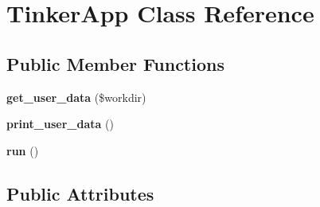 \section{Tinker\-App Class Reference}
\label{classTinkerApp}
\subsection*{Public Member Functions}
\begin{CompactItemize}
\item 
{\bf get\_\-user\_\-data} (\$workdir)
\item 
{\bf print\_\-user\_\-data} ()
\item 
{\bf run} ()
\end{CompactItemize}
\subsection*{Public Attributes}

